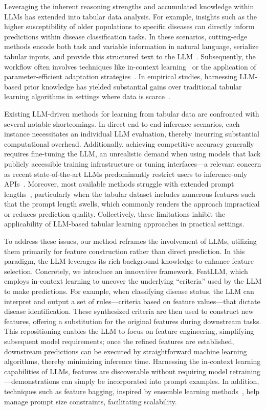 Leveraging the inherent reasoning strengths and accumulated knowledge within LLMs has extended into tabular data analysis. For example, insights such as the higher susceptibility of older populations to specific diseases can directly inform predictions within disease classification tasks. In these scenarios, cutting-edge methods encode both task and variable information in natural language, serialize tabular inputs, and provide this structured text to the LLM~\cite{dinh2022lift,wang2023anypredict}. Subsequently, the workflow often involves techniques like in-context learning~\cite{nam2023semi} or the application of parameter-efficient adaptation strategies~\cite{dinh2022lift,hegselmann2023tabllm}. In empirical studies, harnessing LLM-based prior knowledge has yielded substantial gains over traditional tabular learning algorithms in settings where data is scarce~\cite{hegselmann2023tabllm}.

Existing LLM-driven methods for learning from tabular data are confronted with several notable shortcomings. In direct end-to-end inference scenarios, each instance necessitates an individual LLM evaluation, thereby incurring substantial computational overhead. Additionally, achieving competitive accuracy generally requires fine-tuning the LLM, an unrealistic demand when using models that lack publicly accessible training infrastructure or tuning interfaces—a relevant concern as recent state-of-the-art LLMs predominantly restrict users to inference-only APIs~\cite{anil2023palm,openai2023gpt4}. Moreover, most available methods struggle with extended prompt lengths~\cite{liu2023lost}, particularly when the tabular dataset includes numerous features such that the prompt length swells, which commonly renders the approach impractical or reduces prediction quality. Collectively, these limitations inhibit the applicability of LLM-based tabular learning approaches in practical settings.

To address these issues, our method reframes the involvement of LLMs, utilizing them primarily for feature construction rather than direct prediction. In this paradigm, the LLM leverages its rich background knowledge to enhance feature selection. Concretely, we introduce an innovative framework, \textsf{FeatLLM}, which employs in-context learning to uncover the underlying “criteria” used by the LLM to make predictions. For example, when classifying disease status, the LLM can interpret and output a set of rules—criteria based on feature values—that dictate disease identification. These synthesized criteria are then used to construct new features, offering a substitution for the original features during downstream tasks. This repositioning enables the LLM to focus on feature engineering, simplifying subsequent model requirements; once the refined features are established, downstream predictions can be executed by straightforward machine learning algorithms, thereby minimizing inference time. Harnessing the in-context learning capabilities of LLMs, features are discoverable without requiring model retraining—demonstrations can simply be incorporated into prompt examples. In addition, techniques such as feature bagging, inspired by ensemble learning methods~\cite{breiman2001random}, help manage prompt size constraints, facilitating scalability.

